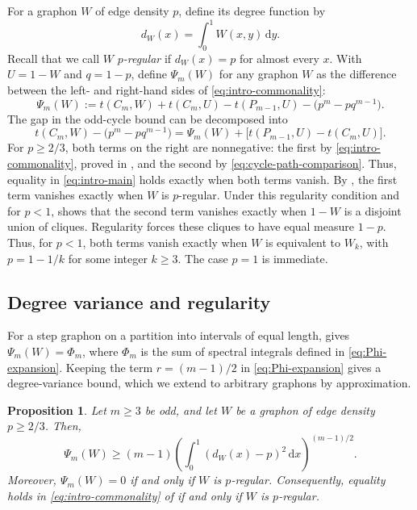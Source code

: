 \documentclass[11pt]{article}
\newtheorem{proposition}[theorem]{Proposition}
\theoremstyle{remark}
\numberwithin{equation}{section}
\newcommand{\dd}{\,\mathrm d}
\newcommand{\tC}[2]{t(C_{#1},#2)}
\newcommand{\tP}[2]{t(P_{#1},#2)}
\newcommand{\dW}{d_W}
\begin{document}
For a graphon $W$ of edge density $p$, define its degree function by
\[
  \dW(x)=\int_0^1 W(x,y)\dd y.
\]
Recall that we call $W$ \emph{$p$-regular} if $\dW(x)=p$ for almost every $x$.
With $U=1-W$ and $q=1-p$, define $\Psi_m(W)$ for any graphon $W$
as the difference between the left- and right-hand sides of
\eqref{eq:intro-commonality}:
\begin{equation}\label{eq:equality-gap}
  \Psi_m(W):=\tC mW+\tC mU-\tP{m-1}U-\bigl(p^m-pq^{m-1}\bigr).
\end{equation}
The gap in the odd-cycle bound can be decomposed into
\begin{equation}\label{eq:one-colour-gap}
  \tC mW-\bigl(p^m-pq^{m-1}\bigr)
  =\Psi_m(W)+\bigl[\tP{m-1}U-\tC mU\bigr].
\end{equation}
For $p\ge2/3$, both terms on the right are nonnegative: the first by
\eqref{eq:intro-commonality}, proved in ,
and the second by \eqref{eq:cycle-path-comparison}.
Thus, equality in \eqref{eq:intro-main} holds exactly when both terms vanish.
By , the first term vanishes exactly when $W$
is $p$-regular. Under this regularity condition and for $p<1$,
 shows that the second term vanishes exactly
when $1-W$ is a disjoint union of cliques. Regularity forces these
cliques to have equal measure $1-p$. Thus, for $p<1$, both terms vanish
exactly when $W$ is equivalent to $W_k$, with $p=1-1/k$ for some integer
$k\ge3$. The case $p=1$ is immediate.

\subsection{Degree variance and regularity}
\label{subsec:degree-variance}

For a step graphon on a partition into intervals of equal length,
 gives
$\Psi_m(W)=\Phi_m$, where $\Phi_m$ is the sum of spectral integrals defined 
in \eqref{eq:Phi-expansion}.
Keeping the term $r=(m-1)/2$ in \eqref{eq:Phi-expansion} gives a degree-variance bound, which we extend to arbitrary graphons by approximation.

\begin{proposition}
\label{prop:regularity-gap}
  Let $m\ge3$ be odd, and let $W$ be a graphon of edge density $p\ge2/3$.
  Then,
  \begin{equation}\label{eq:degree-variance-gap}
    \Psi_m(W)\ge(m-1)
    \left(\int_0^1(\dW(x)-p)^2\dd x\right)^{(m-1)/2}.
  \end{equation}
  Moreover, $\Psi_m(W)=0$ if and only if $W$ is $p$-regular.
  Consequently, equality holds in \eqref{eq:intro-commonality} of
   if and only if $W$ is $p$-regular.
\end{proposition}
\end{document}
